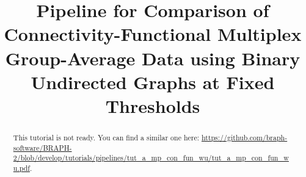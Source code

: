 \documentclass[justified]{tufte-handout}
\title[Comparison of Connectivity-Functional Multiplex Group-Average Data using BUT]{Pipeline for Comparison of Connectivity-Functional Multiplex Group-Average Data using Binary Undirected Graphs at Fixed Thresholds}
\begin{document}
\maketitle

\begin{abstract}
\noindent
This tutorial is not ready. You can find a similar one here: \url{https://github.com/braph-software/BRAPH-2/blob/develop/tutorials/pipelines/tut_a_mp_con_fun_wu/tut_a_mp_con_fun_wu.pdf}.
\end{abstract}
\end{document}
